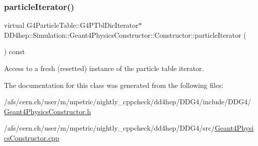 \subsubsection{\texorpdfstring{particle\+Iterator()}{particleIterator()}}
{\footnotesize\ttfamily virtual G4\+Particle\+Table\+::\+G4\+P\+Tbl\+Dic\+Iterator$\ast$ D\+D4hep\+::\+Simulation\+::\+Geant4\+Physics\+Constructor\+::\+Constructor\+::particle\+Iterator (\begin{DoxyParamCaption}{ }\end{DoxyParamCaption}) const\hspace{0.3cm}{\ttfamily [pure virtual]}}



Access to a fresh (resetted) instance of the particle table iterator. 



The documentation for this class was generated from the following files\+:\begin{DoxyCompactItemize}
\item 
/afs/cern.\+ch/user/m/mpetric/nightly\+\_\+cppcheck/dd4hep/\+D\+D\+G4/include/\+D\+D\+G4/\hyperlink{_geant4_physics_constructor_8h}{Geant4\+Physics\+Constructor.\+h}\item 
/afs/cern.\+ch/user/m/mpetric/nightly\+\_\+cppcheck/dd4hep/\+D\+D\+G4/src/\hyperlink{_geant4_physics_constructor_8cpp}{Geant4\+Physics\+Constructor.\+cpp}\end{DoxyCompactItemize}
